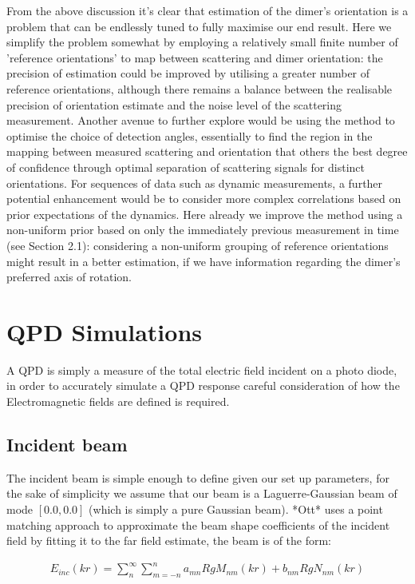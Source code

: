 From the above discussion it’s clear that estimation of the 
dimer’s orientation is a problem that can be endlessly tuned 
to fully maximise our end result. Here we simplify the problem 
somewhat by employing a relatively small finite number of 
'reference orientations' to map between scattering and dimer 
orientation: the precision of estimation could be improved by 
utilising a greater number of reference orientations, although 
there remains a balance between the realisable precision of 
orientation estimate and the noise level of the scattering 
measurement. Another avenue to further explore would be using 
the method to optimise the choice of detection angles, 
essentially to find the region in the mapping between measured 
scattering and orientation that others the best degree of 
confidence through optimal separation of scattering signals 
for distinct orientations. For sequences of data such as 
dynamic measurements, a further potential enhancement would 
be to consider more complex correlations based on prior 
expectations of the dynamics. Here already we improve the 
method using a non-uniform prior based on only the immediately 
previous measurement in time (see Section 2.1): considering 
a non-uniform grouping of reference orientations might result 
in a better estimation, if we have information regarding the 
dimer’s preferred axis of rotation. 

\section{QPD Simulations}
A QPD is simply a measure of the total electric field incident on a photo diode, in order to accurately simulate a QPD response careful consideration of how the Electromagnetic fields are defined is required. 

\subsection{Incident beam}
\label{sec:fibre_scattering}
The incident beam is simple enough to define given our set up parameters, for the sake of simplicity we assume that our beam is a Laguerre-Gaussian beam of mode $[0.0, 0.0]$ (which is simply a pure Gaussian beam). *Ott* uses a point matching approach to approximate the beam shape coefficients of the incident field by fitting it to the far field estimate, the beam is of the form:

\begin{align}
	E_{inc}(kr)=\sum^\infty_n\sum^n_{m=-n}a_{mn}RgM_{nm}(kr)+b_{nm}RgN_{nm}(kr)
\end{align}

